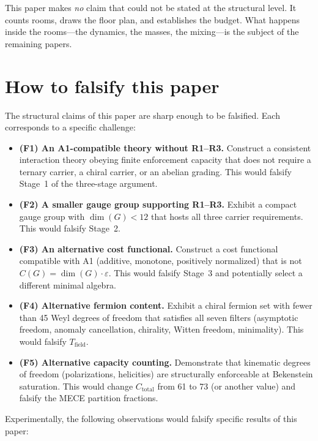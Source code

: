 \documentclass[11pt]{article}
\newenvironment{varlist}{\begin{itemize}[nosep,leftmargin=2em]}{\end{itemize}}
\begin{document}
This paper makes \emph{no} claim that could not be stated at the structural level.  It counts rooms, draws the floor plan, and establishes the budget.  What happens inside the rooms---the dynamics, the masses, the mixing---is the subject of the remaining papers.


\section{How to falsify this paper}
\label{sec:falsify}

The structural claims of this paper are sharp enough to be falsified.  Each corresponds to a specific challenge:

\begin{varlist}
\item \textbf{(F1) An A1-compatible theory without R1--R3.}  Construct a consistent interaction theory obeying finite enforcement capacity that does not require a ternary carrier, a chiral carrier, or an abelian grading.  This would falsify Stage~1 of the three-stage argument.
\item \textbf{(F2) A smaller gauge group supporting R1--R3.}  Exhibit a compact gauge group with $\dim(G) < 12$ that hosts all three carrier requirements.  This would falsify Stage~2.
\item \textbf{(F3) An alternative cost functional.}  Construct a cost functional compatible with A1 (additive, monotone, positively normalized) that is not $C(G) = \dim(G) \cdot \varepsilon$.  This would falsify Stage~3 and potentially select a different minimal algebra.
\item \textbf{(F4) Alternative fermion content.}  Exhibit a chiral fermion set with fewer than 45 Weyl degrees of freedom that satisfies all seven filters (asymptotic freedom, anomaly cancellation, chirality, Witten freedom, minimality).  This would falsify $T_{\mathrm{field}}$.
\item \textbf{(F5) Alternative capacity counting.}  Demonstrate that kinematic degrees of freedom (polarizations, helicities) are structurally enforceable at Bekenstein saturation.  This would change $C_{\mathrm{total}}$ from 61 to 73 (or another value) and falsify the MECE partition fractions.
\end{varlist}

Experimentally, the following observations would falsify specific results of this paper:
\end{document}
